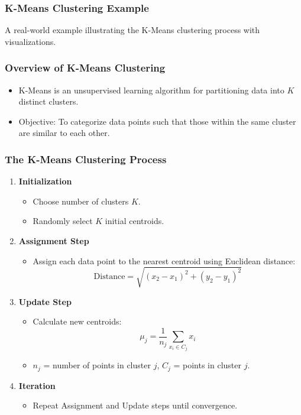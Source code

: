 \documentclass[aspectratio=169]{beamer}
\begin{document}
\begin{frame}[fragile]
    \frametitle{K-Means Clustering Example}
    A real-world example illustrating the K-Means clustering process with visualizations.
\end{frame}

\begin{frame}[fragile]
    \frametitle{Overview of K-Means Clustering}
    \begin{itemize}
        \item K-Means is an unsupervised learning algorithm for partitioning data into \(K\) distinct clusters.
        \item Objective: To categorize data points such that those within the same cluster are similar to each other.
    \end{itemize}
\end{frame}

\begin{frame}[fragile]
    \frametitle{The K-Means Clustering Process}
    \begin{enumerate}
        \item \textbf{Initialization}
            \begin{itemize}
                \item Choose number of clusters \(K\).
                \item Randomly select \(K\) initial centroids.
            \end{itemize}
        \item \textbf{Assignment Step}
            \begin{itemize}
                \item Assign each data point to the nearest centroid using Euclidean distance:
                \begin{equation}
                    \text{Distance} = \sqrt{(x_2 - x_1)^2 + (y_2 - y_1)^2}
                \end{equation}
            \end{itemize}
        \item \textbf{Update Step}
            \begin{itemize}
                \item Calculate new centroids:
                \begin{equation}
                    \mu_j = \frac{1}{n_j} \sum_{x_i \in C_j} x_i
                \end{equation}
                \item \(n_j\) = number of points in cluster \(j\), \(C_j\) = points in cluster \(j\).
            \end{itemize}
        \item \textbf{Iteration}
            \begin{itemize}
                \item Repeat Assignment and Update steps until convergence.
            \end{itemize}
    \end{enumerate}
\end{frame}
\end{document}
